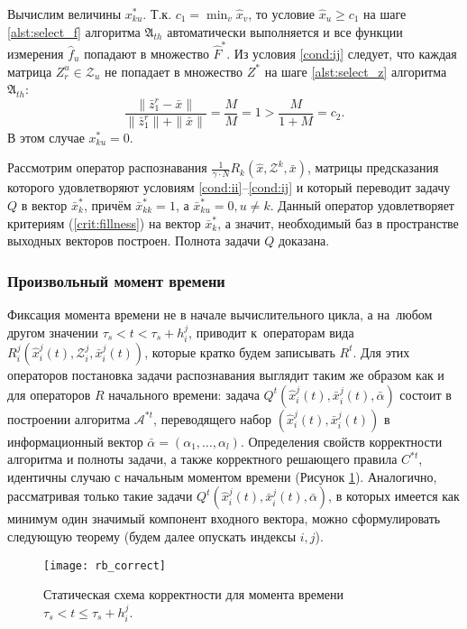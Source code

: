 \begin{Proof}
 Вычислим величины $x_{ku}^*$. Т.к. $c_1=\min_v\hat x_v$, то условие $\hat x_u\geqslant c_1$ на шаге \ref{alst:select_f} алгоритма $\mathfrak{A}_{th}$ автоматически выполняется и все функции измерения $\hat f_u$ попадают в множество $\hat F^*$. Из условия \ref{cond:ij} следует, что каждая матрица $Z_r^u\in\mathcal Z_u$ не попадает в множество $Z^*$ на шаге \ref{alst:select_z} алгоритма $\mathfrak A_{th}$:
 \begin{equation}
 	\frac{\|\bar{z}_1^r-\bar{x}\|}{\|\bar{z}_1^r\|+\|\bar{x}\|}=\frac{M}{M}=1>\frac{M}{1+M}=c_2.
 \end{equation}
 В этом случае $x_{ku}^*=0$.
 
 Рассмотрим оператор распознавания $\frac{1}{\gamma\cdot N}R_k(\hat x,\mathcal Z^k,\bar x)$, матрицы предсказания которого удовлетворяют условиям \ref{cond:ii}--\ref{cond:ij} и который переводит задачу $Q$ в вектор $\bar x_k^*$, причём $\bar x_{kk}^*=1$, а $\bar x_{ku}^*=0, u\neq k$. Данный оператор удовлетворяет критериям (\ref{crit:fillness}) на вектор $\bar x_k^*$, а значит, необходимый баз в пространстве выходных векторов построен. Полнота задачи $Q$ доказана.
\end{Proof}

\subsubsection{Произвольный момент времени}
Фиксация момента времени не в начале вычислительного цикла, а на~любом другом значении $\tau_s<t<\tau_s+h_i^j$, приводит к~операторам вида $R_i^j(\hat{x}_i^j(t), \mathcal{Z}_i^j, \bar{x}_i^j(t))$, которые кратко будем записывать $R^t$. Для этих операторов постановка задачи распознавания выглядит таким же образом как и для операторов $R$ начального времени: задача $Q^t(\hat{x}_i^j(t), \bar{x}_i^j(t), \bar\alpha)$ состоит в построении алгоритма $\mathcal A^{*t}$, переводящего набор $(\hat{x}_i^j(t), \bar{x}_i^j(t))$ в информационный вектор $\bar\alpha=(\alpha_1,\dots,\alpha_l)$. Определения свойств корректности алгоритма и полноты задачи, а также корректного решающего правила $C^{*t}$, идентичны случаю с начальным моментом времени (Рисунок \ref{fig:rb_correct_statt}). Аналогично, рассматривая только такие задачи $Q^t(\hat{x}_i^j(t), \bar{x}_i^j(t), \bar\alpha)$, в которых имеется как минимум один значимый компонент входного вектора, можно сформулировать следующую теорему (будем далее опускать индексы $i,j$).
	
\begin{figure}[h]
	\centering
	\texttt{[image: rb\_correct]}
	\caption{Статическая схема корректности для момента времени $\tau_s<t\leqslant\tau_s+h_i^j$.}
	\label{fig:rb_correct_statt}
\end{figure}
	
